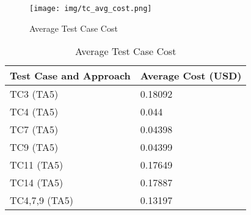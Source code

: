 \begin{figure}[ht]
  \centering
  \texttt{[image: img/tc\_avg\_cost.png]}
  \caption{Average Test Case Cost}
  \label{fig:tc_avg_cost}
\end{figure}

\begin{table}[h!]
  \begin{tabular}{|l | l|}
    \hline
    \textbf{Test Case and Approach} & \textbf{Average Cost (USD)} \\
    \hline
    TC3 (TA5) & 0.18092 \\
    \hline
    TC4 (TA5) & 0.044 \\
    \hline
    TC7 (TA5) & 0.04398 \\
    \hline
    TC9 (TA5) & 0.04399 \\
    \hline
    TC11 (TA5) & 0.17649 \\
    \hline
    TC14 (TA5) & 0.17887 \\
    \hline
    TC4,7,9 (TA5) & 0.13197 \\
    \hline
  \end{tabular}
  \caption{Average Test Case Cost}
  \label{tab:tc_avg_cost}
\end{table}
